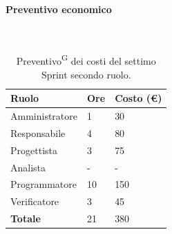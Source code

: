 \documentclass[8pt]{article}
\newcommand{\glossterm}[1]{#1\textsuperscript{G}} %
\newcommand{\subsubsubsection}[1]{\paragraph{#1}\mbox{}\\}
\begin{document}
\subsubsubsection{Preventivo economico}
\begin{table}[ht!]
	\centering
	\begin{tabular}{p{4cm} p{1cm} p{2cm}}
        \toprule
        \textbf{Ruolo} & \textbf{Ore} & \textbf{Costo (€)} \\
        \midrule
        Amministratore & 1  & 30   \\
        Responsabile   & 4  & 80 \\
        Progettista    & 3 & 75 \\
        Analista       & - & - \\
        Programmatore  & 10 & 150 \\
        Verificatore   & 3 & 45 \\
        \midrule
        \textbf{Totale} & 21 & 380 \\
        \bottomrule
    \end{tabular}
    \caption{\glossterm{Preventivo} dei costi del settimo Sprint secondo ruolo.}
	\label{table:Preventivo dei costi del settimo Sprint secondo ruolo}
\end{table}
\clearpage
\end{document}
